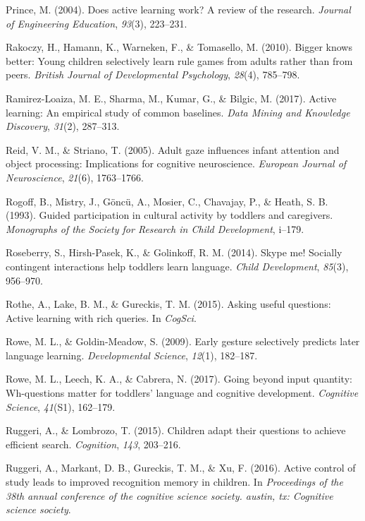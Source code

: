\documentclass[english,floatsintext,man]{apa6}
\theoremstyle{definition}
\theoremstyle{definition}
\theoremstyle{definition}
\theoremstyle{remark}
\begin{document}
\hypertarget{ref-prince2004does}{}
Prince, M. (2004). Does active learning work? A review of the research.
\emph{Journal of Engineering Education}, \emph{93}(3), 223--231.

\hypertarget{ref-rakoczy2010bigger}{}
Rakoczy, H., Hamann, K., Warneken, F., \& Tomasello, M. (2010). Bigger
knows better: Young children selectively learn rule games from adults
rather than from peers. \emph{British Journal of Developmental
Psychology}, \emph{28}(4), 785--798.

\hypertarget{ref-ramirez2017active}{}
Ramirez-Loaiza, M. E., Sharma, M., Kumar, G., \& Bilgic, M. (2017).
Active learning: An empirical study of common baselines. \emph{Data
Mining and Knowledge Discovery}, \emph{31}(2), 287--313.

\hypertarget{ref-reid2005adult}{}
Reid, V. M., \& Striano, T. (2005). Adult gaze influences infant
attention and object processing: Implications for cognitive
neuroscience. \emph{European Journal of Neuroscience}, \emph{21}(6),
1763--1766.

\hypertarget{ref-rogoff1993guided}{}
Rogoff, B., Mistry, J., Göncü, A., Mosier, C., Chavajay, P., \& Heath,
S. B. (1993). Guided participation in cultural activity by toddlers and
caregivers. \emph{Monographs of the Society for Research in Child
Development}, i--179.

\hypertarget{ref-roseberry2014skype}{}
Roseberry, S., Hirsh-Pasek, K., \& Golinkoff, R. M. (2014). Skype me!
Socially contingent interactions help toddlers learn language.
\emph{Child Development}, \emph{85}(3), 956--970.

\hypertarget{ref-rothe2015asking}{}
Rothe, A., Lake, B. M., \& Gureckis, T. M. (2015). Asking useful
questions: Active learning with rich queries. In \emph{CogSci}.

\hypertarget{ref-rowe2009early}{}
Rowe, M. L., \& Goldin-Meadow, S. (2009). Early gesture selectively
predicts later language learning. \emph{Developmental Science},
\emph{12}(1), 182--187.

\hypertarget{ref-rowe2017going}{}
Rowe, M. L., Leech, K. A., \& Cabrera, N. (2017). Going beyond input
quantity: Wh-questions matter for toddlers' language and cognitive
development. \emph{Cognitive Science}, \emph{41}(S1), 162--179.

\hypertarget{ref-ruggeri2015children}{}
Ruggeri, A., \& Lombrozo, T. (2015). Children adapt their questions to
achieve efficient search. \emph{Cognition}, \emph{143}, 203--216.

\hypertarget{ref-ruggeri2016active}{}
Ruggeri, A., Markant, D. B., Gureckis, T. M., \& Xu, F. (2016). Active
control of study leads to improved recognition memory in children. In
\emph{Proceedings of the 38th annual conference of the cognitive science
society. austin, tx: Cognitive science society}.
\end{document}
